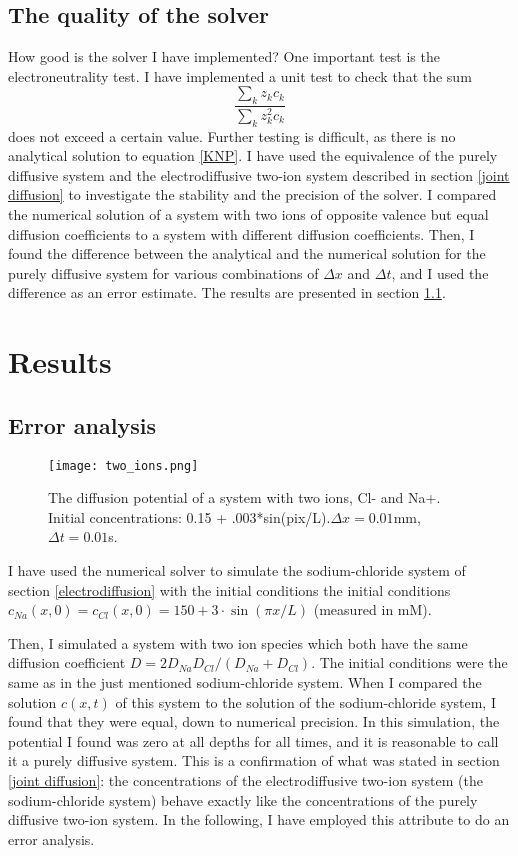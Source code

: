 \documentclass{article}
\begin{document}
\subsection{The quality of the solver}
How good is the solver I have implemented? One important test is the electroneutrality test. I have implemented a unit test to check that the sum 
$$\frac{\sum_k z_k c_k}{\sum_k z_k^2 c_k}$$
does not exceed a certain value. Further testing is difficult, as there is no analytical solution to equation \ref{KNP}. I have used the equivalence of the purely diffusive system and the electrodiffusive two-ion system described in section \ref{joint diffusion} to investigate the stability and the precision of the solver. I compared the numerical solution of a system with two ions of opposite valence but equal diffusion coefficients to a system with different diffusion coefficients. 
Then, I found the difference between the analytical and the numerical solution for the purely diffusive system for various combinations of $\Delta x$ and $\Delta t$, and I used the difference as an error estimate. The results are presented in section \ref{numerical vs analytical}. 

\section{Results}
\subsection{Error analysis}\label{numerical vs analytical}

\begin{figure}
  \texttt{[image: two\_ions.png]}
  \caption{The diffusion potential of a system with two ions, Cl- and Na+. Initial concentrations: 0.15 + .003*sin(pix/L).$\Delta x = 0.01$mm, $\Delta t = 0.01 $s. }
  \label{fig:two_ions}
\end{figure}

I have used the numerical solver to simulate the sodium-chloride system of section \ref{electrodiffusion} with  the initial conditions the initial conditions $c_{Na}(x,0)=c_{Cl}(x,0)=150+3\cdot \sin(\pi x/L)$ (measured in mM). 

Then, I simulated a system with two ion species which both have the same diffusion coefficient $D=2D_{Na}D_{Cl}/(D_{Na}+D_{Cl})$. The initial conditions were the same as in the just mentioned sodium-chloride system. When I compared the solution $c(x,t)$ of this system to the solution of the sodium-chloride system, I found that they were equal, down to numerical precision. In this simulation, the potential I found was zero at all depths for all times, and it is reasonable to call it a purely diffusive system. This is a confirmation of what was stated in section \ref{joint diffusion}: the concentrations of the electrodiffusive two-ion system (the sodium-chloride system) behave exactly like the concentrations of the purely diffusive two-ion system. In the following, I have employed this attribute to do an error analysis. 
\end{document}
